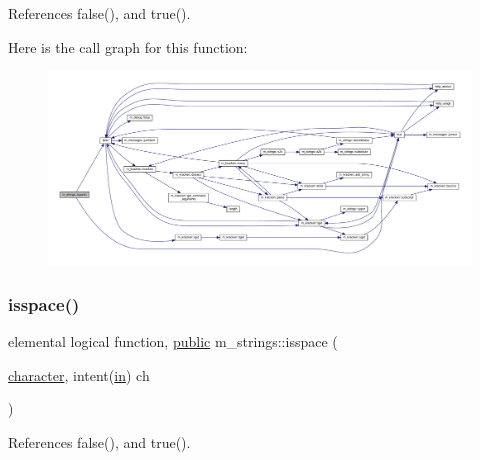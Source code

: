 References false(), and true().

Here is the call graph for this function\+:
\nopagebreak
\begin{figure}[H]
\begin{center}
\leavevmode
\includegraphics[width=350pt]{namespacem__strings_a8712164e1f5fd717bdea854a3f067619_cgraph}
\end{center}
\end{figure}
\mbox{\label{namespacem__strings_ab32380c29451e56395153155c1632d74}} 
\subsubsection{\texorpdfstring{isspace()}{isspace()}}
{\footnotesize\ttfamily elemental logical function, \hyperlink{M__stopwatch_83_8txt_a2f74811300c361e53b430611a7d1769f}{public} m\+\_\+strings\+::isspace (\begin{DoxyParamCaption}\item[{\hyperlink{option__stopwatch_83_8txt_abd4b21fbbd175834027b5224bfe97e66}{character}, intent(\hyperlink{M__journal_83_8txt_afce72651d1eed785a2132bee863b2f38}{in})}]{ch }\end{DoxyParamCaption})}



References false(), and true().

